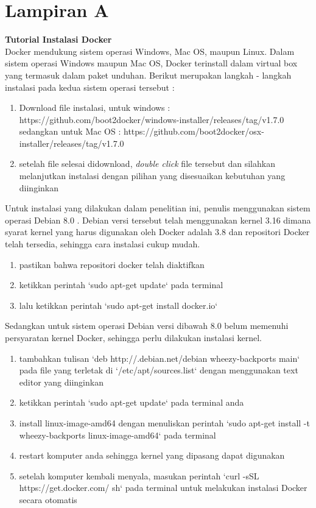 \chapter*{Lampiran A}
\textbf{Tutorial Instalasi Docker} \\ 
Docker mendukung sistem operasi Windows, Mac OS, maupun Linux. Dalam sistem operasi Windows maupun Mac OS, Docker terinstall dalam virtual box yang termasuk dalam paket unduhan. Berikut merupakan langkah - langkah instalasi pada kedua sistem operasi tersebut :
\begin{enumerate}
	\item Download file instalasi, untuk windows : https://github.com/boot2docker/windows-installer/releases/tag/v1.7.0 sedangkan untuk Mac OS : https://github.com/boot2docker/osx-installer/releases/tag/v1.7.0
	\item setelah file selesai didownload, \textit{double click} file tersebut dan silahkan melanjutkan instalasi dengan pilihan yang disesuaikan kebutuhan yang diinginkan
\end{enumerate}
Untuk instalasi yang dilakukan dalam penelitian ini, penulis menggunakan sistem operasi Debian 8.0 . Debian versi tersebut telah menggunakan kernel 3.16 dimana syarat kernel yang harus digunakan oleh Docker adalah 3.8 dan repositori Docker telah tersedia, sehingga cara instalasi cukup mudah.
\begin{enumerate}
	\item pastikan bahwa repositori docker telah diaktifkan
	\item ketikkan perintah `sudo apt-get update` pada terminal
	\item lalu ketikkan perintah `sudo apt-get install docker.io`
\end{enumerate}
Sedangkan untuk sistem operasi Debian versi dibawah 8.0 belum memenuhi persyaratan kernel Docker, sehingga perlu dilakukan instalasi kernel.
\begin{enumerate}
	\item tambahkan tulisan `deb http://.debian.net/debian wheezy-backports main` pada file yang terletak di `/etc/apt/sources.list` dengan menggunakan text editor yang diinginkan
	\item ketikkan perintah `sudo apt-get update` pada terminal anda
	\item install linux-image-amd64 dengan menuliskan perintah `sudo apt-get install -t wheezy-backports linux-image-amd64` pada terminal
	\item restart komputer anda sehingga kernel yang dipasang dapat digunakan
	\item setelah komputer kembali menyala, masukan perintah `curl -sSL https://get.docker.com/ \textbar \hspace{0.2cm}sh` pada terminal untuk melakukan instalasi Docker secara otomatis
\end{enumerate}
